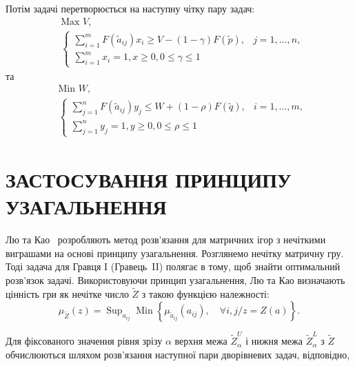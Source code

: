 \documentclass[14pt, a4paper, oneside]{extarticle}
\numberwithin{equation}{section}
\newcommand{\geqslant}{\geq}
\newcommand{\leqslant}{\leq}
\begin{document}
Потім задачі перетворюється на наступну чітку пару задач:
\begin{equation}
\begin{aligned}
&\text{Max } V, \\
&\text{} \begin{cases}
\sum_{i=1}^{m} F\left(\tilde{a}_{i j}\right) x_{i} \geqslant V-(1-\gamma) F(\tilde{p}), & j=1,\dots,n, \\
\sum_{i=1}^{m} x_{i}=1, x \geqslant 0, 0 \leqslant \gamma \leqslant 1
\end{cases}
\end{aligned}
\end{equation}
та
\begin{equation}
\begin{aligned}
&\text{Min } W , \\
&\text{} \begin{cases}
\sum_{j=1}^{n} F\left(\tilde{a}_{i j}\right) y_{j} \leqslant W+(1-\rho) F(\tilde{q}), & i=1,\dots,m, \\
\sum_{j=1}^{n} y_{j}=1,
y \geqslant 0,
0 \leqslant \rho \leqslant 1
\end{cases}
\end{aligned}
\end{equation}

\section{ЗАСТОСУВАННЯ ПРИНЦИПУ УЗАГАЛЬНЕННЯ }
Лю та Као~\cite{N18} розробляють метод розв'язання для матричних ігор з нечіткими виграшами на основі принципу узагальнення. Розглянемо нечітку матричну гру. Тоді задача для Гравця I (Гравець~II) полягає в тому, щоб знайти оптимальний розв’язок задачі. Використовуючи принцип узагальнення, Лю та Као визначають цінність гри як нечітке число $\tilde{Z}$ з такою функцією належності:
\begin{equation}
\mu_{\tilde{Z}}(z)=\operatorname{Sup}_{a_{i j}} \operatorname{Min}\left\{\mu_{\tilde{a}_{i j}}\left(a_{i j}\right), \quad \forall i, j / z=Z(a)\right\} .
\end{equation}

Для фіксованого значення рівня зрізу $\alpha$ верхня межа $\tilde{Z}_{\alpha}^{U}$ і нижня межа $\tilde{Z}_{\alpha}^{L} $ з $\tilde{Z}$ обчислюються шляхом розв'язання наступної пари дворівневих задач, відповідно,
\end{document}
